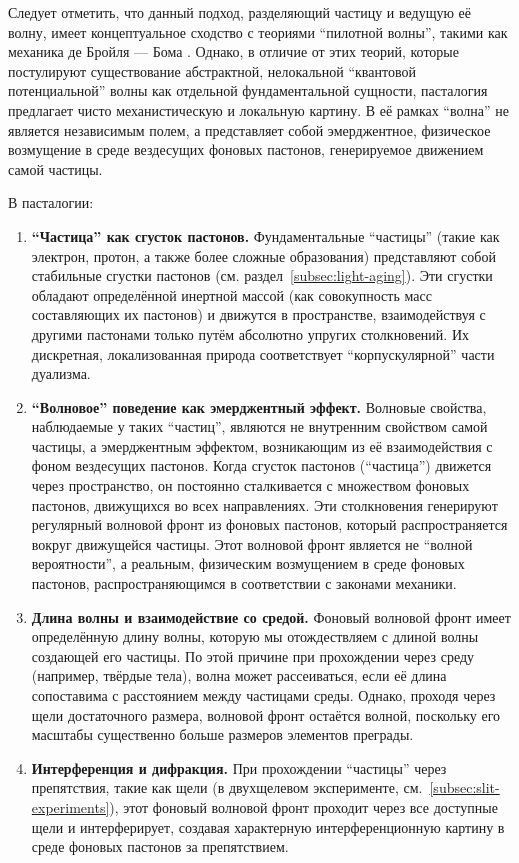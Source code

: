 \documentclass[pdflatex,sn-mathphys-num]{sn-jnl}
\begin{document}
Следует отметить, что данный подход, разделяющий частицу и ведущую её волну, имеет концептуальное сходство с теориями ``пилотной волны'', такими как механика де Бройля — Бома \cite{bohm1952-interpretation}. Однако, в отличие от этих теорий, которые постулируют существование абстрактной, нелокальной ``квантовой потенциальной'' волны как отдельной фундаментальной сущности, пасталогия предлагает чисто механистическую и локальную картину. В её рамках ``волна'' не является независимым полем, а представляет собой эмерджентное, физическое возмущение в среде вездесущих фоновых пастонов, генерируемое движением самой частицы.

В пасталогии:
\begin{enumerate}
    \item \textbf{``Частица'' как сгусток пастонов.} Фундаментальные ``частицы'' (такие как электрон, протон, а также более сложные образования) представляют собой стабильные сгустки пастонов (см. раздел~\ref{subsec:light-aging}). Эти сгустки обладают определённой инертной массой (как совокупность масс составляющих их пастонов) и движутся в пространстве, взаимодействуя с другими пастонами только путём абсолютно упругих столкновений. Их дискретная, локализованная природа соответствует ``корпускулярной'' части дуализма.
    \item \textbf{``Волновое'' поведение как эмерджентный эффект.} Волновые свойства, наблюдаемые у таких ``частиц'', являются не внутренним свойством самой частицы, а эмерджентным эффектом, возникающим из её взаимодействия с фоном вездесущих пастонов. Когда сгусток пастонов (``частица'') движется через пространство, он постоянно сталкивается с множеством фоновых пастонов, движущихся во всех направлениях. Эти столкновения генерируют регулярный волновой фронт из фоновых пастонов, который распространяется вокруг движущейся частицы. Этот волновой фронт является не ``волной вероятности'', а реальным, физическим возмущением в среде фоновых пастонов, распространяющимся в соответствии с законами механики.
    \item \textbf{Длина волны и взаимодействие со средой.} Фоновый волновой фронт имеет определённую длину волны, которую мы отождествляем с длиной волны создающей его частицы. По этой причине при прохождении через среду (например, твёрдые тела), волна может рассеиваться, если её длина сопоставима с расстоянием между частицами среды. Однако, проходя через щели достаточного размера, волновой фронт остаётся волной, поскольку его масштабы существенно больше размеров элементов преграды.
    \item \textbf{Интерференция и дифракция.} При прохождении ``частицы'' через препятствия, такие как щели (в двухщелевом эксперименте, см.~\ref{subsec:slit-experiments}), этот фоновый волновой фронт проходит через все доступные щели и интерферирует, создавая характерную интерференционную картину в среде фоновых пастонов за препятствием.

\end{enumerate}
\end{document}
